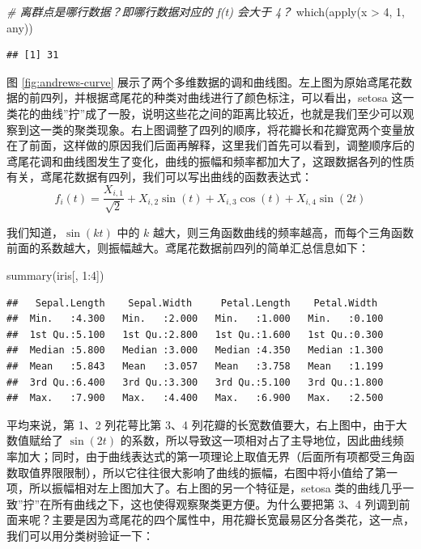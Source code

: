 \documentclass[
  b5paper,
  UTF8,twoside]{book}
\newenvironment{Shaded}{\begin{snugshade}}{\end{snugshade}}
\newcommand{\CommentTok}[1]{\textcolor[rgb]{0.56,0.35,0.01}{\textit{#1}}}
\newcommand{\DecValTok}[1]{\textcolor[rgb]{0.00,0.00,0.81}{#1}}
\newcommand{\FunctionTok}[1]{\textcolor[rgb]{0.00,0.00,0.00}{#1}}
\newcommand{\NormalTok}[1]{#1}
\newcommand{\SpecialCharTok}[1]{\textcolor[rgb]{0.00,0.00,0.00}{#1}}
\begin{document}
\begin{Shaded}
\begin{Highlighting}[]
\CommentTok{\# 离群点是哪行数据？即哪行数据对应的 f(t) 会大于 4？}
\FunctionTok{which}\NormalTok{(}\FunctionTok{apply}\NormalTok{(x }\SpecialCharTok{\textgreater{}} \DecValTok{4}\NormalTok{, }\DecValTok{1}\NormalTok{, any))}
\end{Highlighting}
\end{Shaded}

\begin{verbatim}
## [1] 31
\end{verbatim}

图 \ref{fig:andrews-curve}
展示了两个多维数据的调和曲线图。左上图为原始鸢尾花数据的前四列，并根据鸢尾花的种类对曲线进行了颜色标注，可以看出，setosa 这一类花的曲线''拧''成了一股，说明这些花之间的距离比较近，也就是我们至少可以观察到这一类的聚类现象。右上图调整了四列的顺序，将花瓣长和花瓣宽两个变量放在了前面，这样做的原因我们后面再解释，这里我们首先可以看到，调整顺序后的鸢尾花调和曲线图发生了变化，曲线的振幅和频率都加大了，这跟数据各列的性质有关，鸢尾花数据有四列，我们可以写出曲线的函数表达式：
\[f_{i}(t)=\frac{X_{i,1}}{\sqrt{2}}+X_{i,2}\sin(t)+X_{i,3}\cos(t)+X_{i,4}\sin(2t)\]

我们知道，\(\sin(kt)\) 中的 \(k\) 越大，则三角函数曲线的频率越高，而每个三角函数前面的系数越大，则振幅越大。鸢尾花数据前四列的简单汇总信息如下：

\begin{Shaded}
\begin{Highlighting}[]
\FunctionTok{summary}\NormalTok{(iris[, }\DecValTok{1}\SpecialCharTok{:}\DecValTok{4}\NormalTok{])}
\end{Highlighting}
\end{Shaded}

\begin{verbatim}
##   Sepal.Length    Sepal.Width     Petal.Length    Petal.Width   
##  Min.   :4.300   Min.   :2.000   Min.   :1.000   Min.   :0.100  
##  1st Qu.:5.100   1st Qu.:2.800   1st Qu.:1.600   1st Qu.:0.300  
##  Median :5.800   Median :3.000   Median :4.350   Median :1.300  
##  Mean   :5.843   Mean   :3.057   Mean   :3.758   Mean   :1.199  
##  3rd Qu.:6.400   3rd Qu.:3.300   3rd Qu.:5.100   3rd Qu.:1.800  
##  Max.   :7.900   Max.   :4.400   Max.   :6.900   Max.   :2.500
\end{verbatim}

平均来说，第 1、2 列花萼比第 3、4 列花瓣的长宽数值要大，右上图中，由于大数值赋给了 \(\sin(2t)\) 的系数，所以导致这一项相对占了主导地位，因此曲线频率加大；同时，由于曲线表达式的第一项理论上取值无界（后面所有项都受三角函数取值界限限制），所以它往往很大影响了曲线的振幅，右图中将小值给了第一项，所以振幅相对左上图加大了。右上图的另一个特征是，setosa 类的曲线几乎一致''拧''在所有曲线之下，这也使得观察聚类更方便。为什么要把第 3、4 列调到前面来呢？主要是因为鸢尾花的四个属性中，用花瓣长宽最易区分各类花，这一点，我们可以用分类树验证一下：
\end{document}
